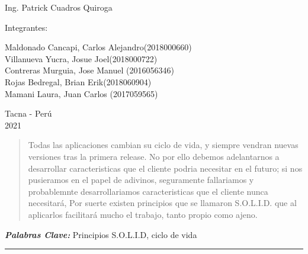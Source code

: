 \documentclass[12pt,letterpaper]{article}
\providecommand{\pclave}[1]
{
  \small	
  \textbf{\textit{Palabras Clave:}} #1
}
\begin{document}
\begin{titlepage}
\begin{center}
\vspace*{0.1in}
\begin{large}
 Ing. Patrick Cuadros Quiroga\\
\end{large}

\vspace*{0.2in}
\vspace*{0.1in}
\begin{large}
Integrantes:\\
\begin{flushleft}
Maldonado Cancapi, Carlos Alejandro\hfill(2018000660) \\
Villanueva Yucra, Josue Joel\hfill(2018000722)\\
Contreras Murguia, Jose Manuel \hfill(2016056346)\\
Rojas Bedregal, Brian Erik\hfill(2018060904)\\
Mamani Laura, Juan Carlos \hfill(2017059565)\\

\end{flushleft}
\end{large}

\vspace*{0.1in}
\begin{large}
Tacna - Perú\\
2021\\

\end{large}
\end{center}

\end{titlepage}

\begin{abstract}
    Todas las aplicaciones cambian su ciclo de vida, y siempre vendran nuevas versiones tras la primera release. No por ello debemos adelantarnos a desarrollar caracteristicas que el cliente
    podria necesitar en el futuro; si nos pusieramos en el papel de adivinos, seguramente fallariamos y probablemnte desarrollariamos caracteristicas que el cliente nunca necesitará, Por suerte existen principios que se llamaron
    S.O.L.I.D. que al aplicarlos facilitará mucho el trabajo, tanto propio como ajeno.  

\end{abstract}
\pclave{Principios S.O.L.I.D, ciclo de vida}

\begin{center}\rule{1\textwidth}{0.05mm} \end{center}
\end{document}
